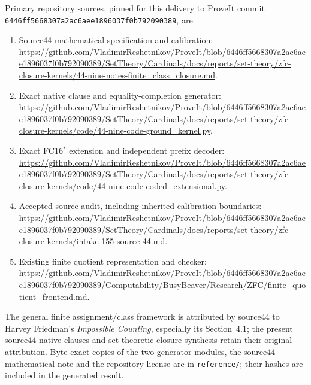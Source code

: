 Primary repository sources, pinned for this delivery to ProveIt commit
\texttt{6446ff5668307a2ac6aee1896037f0b792090389}, are:
\begin{enumerate}
\item Source44 mathematical specification and calibration:
\url{https://github.com/VladimirReshetnikov/ProveIt/blob/6446ff5668307a2ac6aee1896037f0b792090389/SetTheory/Cardinals/docs/reports/set-theory/zfc-closure-kernels/44-nine-notes-finite_class_closure.md}.
\item Exact native clause and equality-completion generator:
\url{https://github.com/VladimirReshetnikov/ProveIt/blob/6446ff5668307a2ac6aee1896037f0b792090389/SetTheory/Cardinals/docs/reports/set-theory/zfc-closure-kernels/code/44-nine-code-ground_kernel.py}.
\item Exact FC16$^*$ extension and independent prefix decoder:
\url{https://github.com/VladimirReshetnikov/ProveIt/blob/6446ff5668307a2ac6aee1896037f0b792090389/SetTheory/Cardinals/docs/reports/set-theory/zfc-closure-kernels/code/44-nine-code-coded_extensional.py}.
\item Accepted source audit, including inherited calibration boundaries:
\url{https://github.com/VladimirReshetnikov/ProveIt/blob/6446ff5668307a2ac6aee1896037f0b792090389/SetTheory/Cardinals/docs/reports/set-theory/zfc-closure-kernels/intake-155-source-44.md}.
\item Existing finite quotient representation and checker:
\url{https://github.com/VladimirReshetnikov/ProveIt/blob/6446ff5668307a2ac6aee1896037f0b792090389/Computability/BusyBeaver/Research/ZFC/finite_quotient_frontend.md}.
\end{enumerate}
The general finite assignment/class framework is attributed by source44
to Harvey Friedman's \emph{Impossible Counting}, especially its
Section~4.1; the present source44 native clauses and set-theoretic closure
synthesis retain their original attribution. Byte-exact copies of the
two generator modules, the source44 mathematical note and the repository
license are in \texttt{reference/}; their hashes are included in the
generated result.
